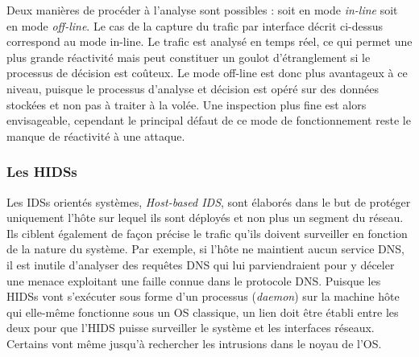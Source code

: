 \documentclass[]{article}
\begin{document}
\par Deux manières de procéder à l'analyse sont possibles : soit en mode \textit{in-line} soit en mode \textit{off-line}. Le cas de la capture du trafic par interface décrit ci-dessus correspond au mode in-line. Le trafic est analysé en temps réel, ce qui permet une plus grande réactivité mais peut constituer un goulot d'étranglement si le processus de décision est coûteux. Le mode off-line est donc plus avantageux à ce niveau, puisque le processus d'analyse et décision est opéré sur des données stockées et non pas à traiter à la volée. Une inspection plus fine est alors envisageable, cependant le principal défaut de ce mode de fonctionnement reste le manque de réactivité à une attaque.

\newpage
\subsubsection{Les HIDSs}

\par Les IDSs orientés systèmes, \textit{Host-based IDS}, sont élaborés dans le but de protéger uniquement l'hôte sur lequel ils sont déployés et non plus un segment du réseau. Ils ciblent également de façon précise le trafic qu'ils doivent surveiller en fonction de la nature du système. Par exemple, si l'hôte ne maintient aucun service DNS, il est inutile d'analyser des requêtes DNS qui lui parviendraient pour y déceler une menace exploitant une faille connue dans le protocole DNS. Puisque les HIDSs vont s'exécuter sous forme d'un processus (\textit{daemon}) sur la machine hôte qui elle-même fonctionne sous un OS classique, un lien doit être établi entre les deux pour que l'HIDS puisse surveiller le système et les interfaces réseaux. Certains vont même jusqu'à rechercher les intrusions dans le noyau de l'OS.\\
\end{document}
